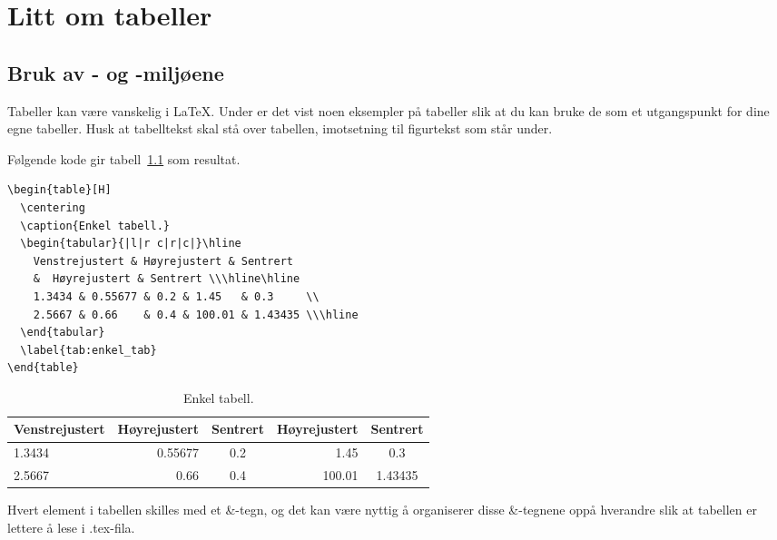 
\chapter{Litt om tabeller}\label{kap:tabeller}

\section{Bruk av - og -miljøene}

Tabeller kan være vanskelig i \LaTeX. Under er det vist noen eksempler
på tabeller slik at du kan bruke de som et utgangspunkt for dine egne
tabeller.
Husk at
tabelltekst skal stå over tabellen, imotsetning til figurtekst som
står under.

Følgende kode gir tabell~\ref{tab:enkel_tab}
som resultat. 

\begin{boxedminipage}{\textwidth}
\begin{verbatim}
\begin{table}[H]
  \centering
  \caption{Enkel tabell.}
  \begin{tabular}{|l|r c|r|c|}\hline
    Venstrejustert & Høyrejustert & Sentrert 
    &  Høyrejustert & Sentrert \\\hline\hline 
    1.3434 & 0.55677 & 0.2 & 1.45   & 0.3     \\
    2.5667 & 0.66    & 0.4 & 100.01 & 1.43435 \\\hline
  \end{tabular}
  \label{tab:enkel_tab}
\end{table}
\end{verbatim}
\end{boxedminipage}

\begin{table}[H]
  \centering
  \caption{Enkel tabell.}
  \begin{tabular}{|l|r c|r|c|}\hline
    Venstrejustert & Høyrejustert & Sentrert 
    &  Høyrejustert & Sentrert \\\hline\hline 
    1.3434 & 0.55677 & 0.2 & 1.45     & 0.3  \\
    2.5667 & 0.66       & 0.4 & 100.01 & 1.43435  \\\hline
  \end{tabular}
  \label{tab:enkel_tab}
\end{table}
Hvert element i tabellen skilles med et \&-tegn, og det kan være
nyttig å organiserer disse \&-tegnene oppå hverandre slik at tabellen
er lettere å lese i .tex-fila.  


